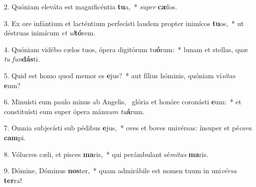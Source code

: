 2. Quóniam eleváta est magnificéntia \textbf{tu}a,~*  \textit{su}\textit{per} \textbf{cæ}los.\

3. Ex ore infántium et lacténtium perfecísti laudem propter inimícos \textbf{tu}os,~*  ut déstruas inimícum \textit{et} \textit{ul}\textbf{tó}rem.\

4. Quóniam vidébo cælos tuos, ópera digitórum tu\textbf{ó}rum:~*  lunam et stellas, quæ \textit{tu} \textit{fun}\textbf{dás}ti.\

5. Quid est homo quod memor es \textbf{e}jus?~*  aut fílius hóminis, quóniam ví\textit{si}\textit{tas} \textbf{e}um?\

6. Minuísti eum paulo minus ab Angelis, \dag\  glória et honóre coronásti \textbf{e}um:~*  et constituísti eum super ópera mánu\textit{um} \textit{tu}\textbf{á}rum.\

7. Omnia subjecísti sub pédibus \textbf{e}jus,~*  oves et boves univérsas: ínsuper et pé\textit{co}\textit{ra} \textbf{cam}pi.\

8. Vólucres cæli, et pisces \textbf{ma}ris,~*  qui perámbulant sé\textit{mi}\textit{tas} \textbf{ma}ris.\

9. Dómine, Dóminus \textbf{nos}ter,~*  quam admirábile est nomen tuum in uni\textit{vér}\textit{sa} \textbf{ter}ra!\

